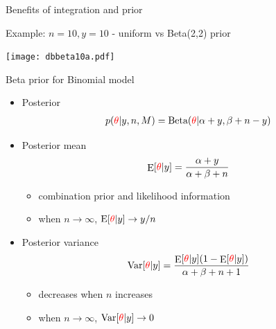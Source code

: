 \documentclass[english,t]{beamer}
\DeclareMathOperator{\E}{E}
\DeclareMathOperator{\Var}{Var}
\begin{document}


\begin{frame}{Benefits of integration and prior}

  \vspace{-0.5\baselineskip}
  Example: $n=10, y=10$ - uniform vs Beta(2,2) prior
  \begin{center}
    \texttt{[image: dbbeta10a.pdf]}\\
  \end{center}

\end{frame}

\begin{frame}{Beta prior for Binomial model}

  \begin{itemize}
  \item Posterior
    \baselineskip
    \begin{align*}
      p({\color{red} \theta}|y,n,M) = \text{Beta}({\color{red} \theta}|\alpha+y,\beta+n-y)
    \end{align*}
  \item Posterior mean
    \baselineskip
    \begin{align*}
      \E[{\color{red} \theta}|y] = \frac{\alpha+y}{\alpha+\beta+n}
    \end{align*}
    \begin{itemize}
    \item combination prior and likelihood information
    \item when $n\rightarrow\infty$, $\text{E}[{\color{red} \theta}|y]\rightarrow y/n$
    \end{itemize}
    \pause
  \item  Posterior variance
    \baselineskip
    \begin{align*}
      \Var[{\color{red} \theta}|y]=\frac{\E[{\color{red} \theta}|y](1-\E[{\color{red} \theta}|y])}{\alpha+\beta+n+1}
    \end{align*}
    \begin{itemize}
    \item decreases when $n$ increases
    \item when $n\rightarrow\infty$, $\text{Var}[{\color{red} \theta}|y]\rightarrow 0$
    \end{itemize}      
  \end{itemize}

\end{frame}
\end{document}
